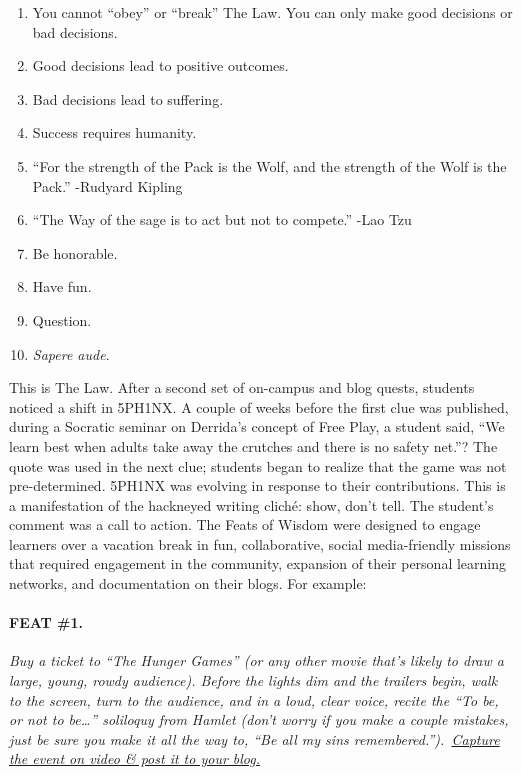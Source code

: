 \begin{enumerate}
\def\labelenumi{\arabic{enumi}.}
\item
  You cannot ``obey'' or ``break'' The Law. You can only make good
  decisions or bad decisions.
\item
  Good decisions lead to positive outcomes.
\item
  Bad decisions lead to suffering.
\item
  Success requires humanity.
\item
  ``For the strength of the Pack is the Wolf, and the strength of the
  Wolf is the Pack.'' -Rudyard Kipling
\item
  ``The Way of the sage is to act but not to compete.'' -Lao Tzu
\item
  Be honorable.
\item
  Have fun.
\item
  Question.
\item
  \emph{Sapere aude}.
\end{enumerate}

This is The Law. After a second set of on-campus and blog quests,
students noticed a shift in 5PH1NX. A couple of weeks before the first
clue was published, during a Socratic seminar on Derrida's concept of
Free Play, a student said, ``We learn best when adults take away the
crutches and there is no safety net.''? The quote was used in the next
clue; students began to realize that the game was not pre-determined.
5PH1NX was evolving in response to their contributions. This is a
manifestation of the hackneyed writing cliché: show, don't tell. The
student's comment was a call to action. The Feats of Wisdom were
designed to engage learners over a vacation break in fun, collaborative,
social media-friendly missions that required engagement in the
community, expansion of their personal learning networks, and
documentation on their blogs. For example:

\hypertarget{feat-1.}{%
\paragraph{FEAT \#1.}\label{feat-1.}}

\emph{Buy a ticket to ``The Hunger Games'' (or any other movie that's
likely to draw a large, young, rowdy audience). Before the lights dim
and the trailers begin, walk to the screen, turn to the audience, and in
a loud, clear voice, recite the ``To be, or not to be\ldots{}''
soliloquy from Hamlet (don't worry if you make a couple mistakes, just
be sure you make it all the way to, ``Be all my sins
remembered.'').~\href{http://alarhsenglitcomp.blogspot.com/2012/12/feats-of-wisdom-1_15.html}{Capture
the event on video \& post it to your blog.}}

